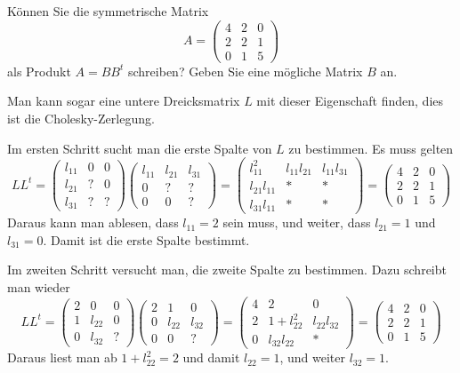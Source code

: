 Können Sie die symmetrische Matrix
\[
A
=
\begin{pmatrix}
4&2&0\\
2&2&1\\
0&1&5
\end{pmatrix}
\]
als Produkt $A=BB^t$ schreiben? Geben Sie eine mögliche
Matrix $B$ an.

\begin{loesung}
Man kann sogar eine untere Dreicksmatrix $L$ mit dieser Eigenschaft
finden, dies ist die Cholesky-Zerlegung.

Im ersten Schritt sucht man die erste Spalte von $L$ zu bestimmen.
Es muss gelten
\[
LL^t=
\begin{pmatrix}
l_{11}&  0&  0\\
l_{21}&  ?&  0\\
l_{31}&  ?&  ?
\end{pmatrix}
\begin{pmatrix}
l_{11}&l_{21}&l_{31}\\
     0&     ?&     ?\\
     0&     0&     ?
\end{pmatrix}
=
\begin{pmatrix}
    l_{11}^2&l_{11}l_{21}&l_{11}l_{31}\\
l_{21}l_{11}&           *&           *\\
l_{31}l_{11}&           *&           *
\end{pmatrix}
=
\begin{pmatrix}
4&2&0\\
2&2&1\\
0&1&5
\end{pmatrix}
\]
Daraus kann man ablesen, dass $l_{11}=2$ sein muss, und weiter,
dass
$l_{21}=1$ und $l_{31}=0$. Damit ist die erste Spalte bestimmt.

Im zweiten Schritt versucht man, die zweite Spalte zu bestimmen.
Dazu schreibt man wieder
\[
LL^t
=
\begin{pmatrix}
2&     0&0\\
1&l_{22}&0\\
0&l_{32}&?
\end{pmatrix}
\begin{pmatrix}
2&     1&     0\\
0&l_{22}&l_{32}\\
0&     0&?
\end{pmatrix}
=
\begin{pmatrix}
4&2           &           0\\
2&1+l_{22}^2  &l_{22}l_{32}\\
0&l_{32}l_{22}&         *
\end{pmatrix}
=
\begin{pmatrix}
4&2&0\\
2&2&1\\
0&1&5
\end{pmatrix}
\]
Daraus liest man ab $1+l_{22}^2=2$ und damit $l_{22}=1$, und weiter
$l_{32}=1$.


\end{loesung}

